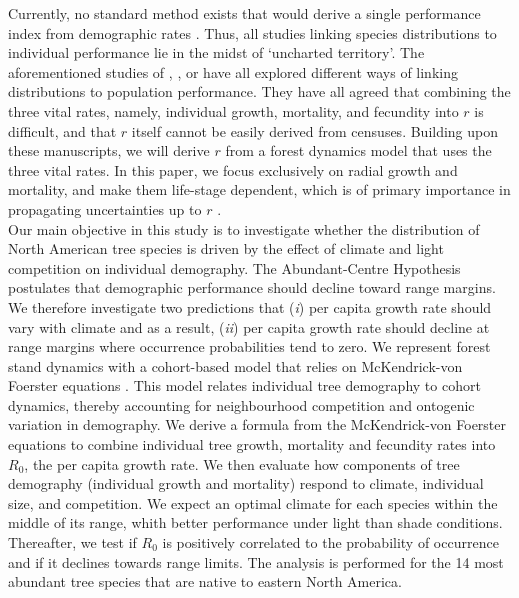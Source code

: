 Currently, no standard method exists that would derive a single performance index from demographic rates \citep{Purves2009}. Thus, all studies linking species distributions to individual performance lie in the midst of `uncharted territory'. The aforementioned studies of \citeauthor{McGill2012}, \citeauthor{Thuiller2014}, or \citeauthor{Pagel2012} have all explored different ways of linking distributions to population performance. They have all agreed that combining the three vital rates, namely, individual growth, mortality, and fecundity into $ r $ is difficult, and that $ r $ itself cannot be easily derived from censuses. Building upon these manuscripts, we will derive $ r $ from a forest dynamics model that uses the three vital rates. In this paper, we focus exclusively on radial growth and mortality, and make them life-stage dependent, which is of primary importance in propagating uncertainties up to $ r $ \citep[$ \lambda $ in his article]{Clark2003b}. \\

Our main objective in this study is to investigate whether the distribution of North American tree species is driven by the effect of climate and light competition on individual demography. The Abundant-Centre Hypothesis postulates that demographic performance should decline toward range margins. We therefore investigate two predictions that (\textit{i}) per capita growth rate should vary with climate and as a result, (\textit{ii}) per capita growth rate should decline at range margins where occurrence probabilities tend to zero. We represent forest stand dynamics with a cohort-based model that relies on McKendrick-von Foerster equations \citep{Strigul2008}. This model relates individual tree demography to cohort dynamics, thereby accounting for neighbourhood competition and ontogenic variation in demography. We derive a formula from the McKendrick-von Foerster equations to combine individual tree growth, mortality and fecundity rates into $ R_0 $, the per capita growth rate. We then evaluate how components of tree demography (individual growth and mortality) respond to climate, individual size, and competition. We expect an optimal climate for each species within the middle of its range, whith better performance under light than shade conditions. Thereafter, we test if $ R_0 $ is positively correlated to the probability of occurrence and if it declines towards range limits. The analysis is performed for the 14 most abundant tree species that are native to eastern North America.

